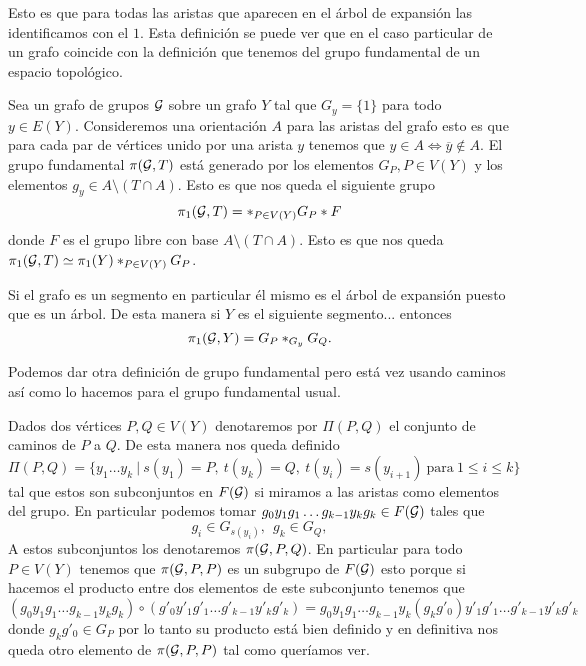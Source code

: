 \documentclass[tesis.tex]{subfiles}
\newcommand{\cG}{ {\cal G} }
\begin{document}
Esto es que para todas las aristas que aparecen en el árbol de expansión las identificamos con el $1$. 
Esta definición se puede ver que en el caso particular de un grafo coincide con la definición que tenemos del grupo fundamental de un espacio topológico.

\begin{ej}
Sea un grafo de grupos $\cal G$ sobre un grafo $Y$ tal que $G_y = \{ 1 \}$ para todo $y \in E(Y)$.
Consideremos una orientación $A$ para las aristas del grafo esto es que para cada par de vértices unido por una arista $y$ tenemos que $y \in A \iff \overline y \notin A$.
El grupo fundamental $\pi({\cal G}, T)$ está generado por los elementos $G_P, P \in V(Y)$ y los elementos $g_y \in A \setminus (T \cap A)$.
Esto es que nos queda el siguiente grupo
\[
\pi_1({\cal G}, T) = \ast_{P \in V(Y)} G_P \ast F
\]
donde $F$ es el grupo libre con base $A \setminus (T \cap A)$.
Esto es que nos queda $\pi_1({\cal G}, T) \simeq \pi_1(Y) \ast_{P \in V(Y)} G_P$.
\end{ej}

\begin{ej}
	Si el grafo es un segmento en particular él mismo es el árbol de expansión puesto que es un árbol.
	De esta manera si $Y$ es el siguiente segmento... 
	entonces
	\[
	\pi_1({\cal G}, Y) = G_P \ast_{G_y} G_Q.
	\]
\end{ej}

Podemos dar otra definición de grupo fundamental pero está vez usando caminos así como lo hacemos para el grupo fundamental usual.

\medskip
Dados dos vértices $P,Q \in V(Y)$ denotaremos por $\Pi(P,Q)$ el conjunto de caminos de $P$ a $Q$.
De esta manera nos queda definido
\[
\Pi(P,Q) = \{  y_1 \dots y_k \ | \ s(y_1)=P, \ t(y_k) = Q, \ t(y_i) = s(y_{i+1})  \ \text{para} \ 1 \le i \le k \}
\]
tal que estos son subconjuntos en $F(\cG)$ si miramos a las aristas como elementos del grupo.
En particular podemos tomar $g_0y_1g_1 \dots g_{k-1}y_kg_k \in F(\cG)$ tales que
\[
g_i \in G_{s(y_i)}, \ \ g_k \in G_Q,
\]
A estos subconjuntos los denotaremos $\pi(\cG, P, Q)$. 
En particular para todo $P \in V(Y)$ tenemos que $\pi(\cG,P,P)$ es un subgrupo de $F(\cG)$ esto porque si hacemos el producto entre dos elementos de este subconjunto tenemos que
\begin{equation*}
	(g_0y_1g_1 \dots g_{k-1}y_kg_k ) \circ ( g'_0y'_1g'_1 \dots g'_{k-1}y'_kg'_k) =  g_0y_1g_1 \dots g_{k-1}y_k(g_kg'_0)y'_1g'_1 \dots g'_{k-1}y'_kg'_k
\end{equation*}
donde $g_kg'_0 \in G_P$ por lo tanto su producto está bien definido y en definitiva nos queda otro elemento de $\pi(\cG, P, P)$ tal como queríamos ver.
\end{document}
